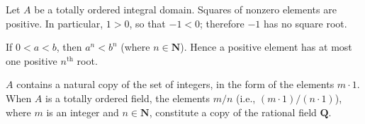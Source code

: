 Let $A$ be a totally ordered integral domain. Squares of nonzero elements are positive. In particular, $1 > 0$, so that $-1 < 0$; therefore $-1$ has no square root.

If $0 < a < b$, then $a^n < b^n$ (where $n \in \mathbf{N}$). Hence a positive element has at most one positive $n^{\text{th}}$ root.

$A$ contains a natural copy of the set of integers, in the form of the elements $m \cdot 1$. When $A$ is a totally ordered field, the elements $m/n$ (i.e., $(m \cdot 1)/(n \cdot 1)$), where $m$ is an integer and $n \in \mathbf{N}$, constitute a copy of the rational field $\mathbf{Q}$.
